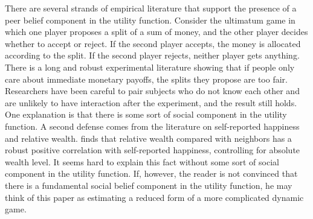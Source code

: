 \documentclass[11pt]{article}
\begin{document}
\begin{CJK}{UTF8}{gbsn}
There are several strands of empirical literature that support the presence of a peer belief component in the utility function.  Consider the ultimatum game in which one player proposes a split of a sum of money, and the other player decides whether to accept or reject.  If the second player accepts, the money is allocated according to the split. If the second player rejects, neither player gets anything.  There is a long and robust experimental literature showing that if people only care about immediate monetary payoffs, the splits they propose are too fair.  Researchers have been careful to pair subjects who do not know each other and are unlikely to have interaction after the experiment, and the result still holds.  One explanation is that there is some sort of social component in the utility function. \citep{FehrSchmidt1999,BoltonOckenfels2000}  A second defense comes from the literature on self-reported happiness and relative wealth.  \citet{Luttmer2004} finds that relative wealth compared with neighbors has a robust positive correlation  with self-reported happiness, controlling for absolute wealth level.  It seems hard to explain this fact without some sort of social component in the utility function.  If, however, the reader is not convinced that there is a fundamental social belief component in the utility function, he may think of this paper as estimating a reduced form of a more complicated dynamic game. 


\end{CJK}
\end{document}
